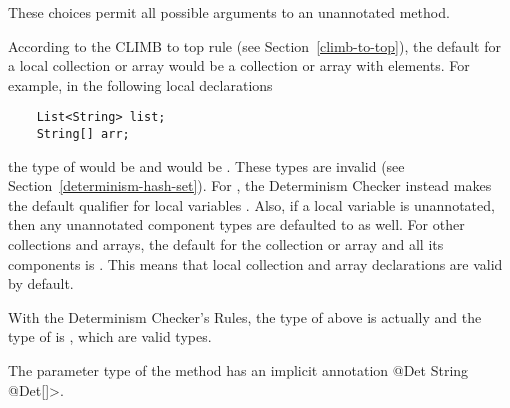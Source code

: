 These choices permit all possible arguments to an unannotated method.

According to the CLIMB to top rule (see Section~\ref{climb-to-top}), the default
for a local collection or array would be a  collection or array
with  elements. For example, in the following local declarations
\begin{Verbatim}
    List<String> list;
    String[] arr;
\end{Verbatim}
the type of  would be  and
 would be . These types are invalid (see
Section~\ref{determinism-hash-set}). For , the Determinism Checker
instead makes the default qualifier for local variables . Also, if a local
 variable is unannotated, then any unannotated component types are
defaulted to  as well. For other collections and arrays, the default
for the collection or array and all its components is . This means
that local collection and array declarations are valid by default.

With the Determinism Checker's Rules, the type of  above is actually
 and the type of  is , which are valid types.

The parameter type of the  method has an implicit annotation
\<@Det String @Det[]>.


